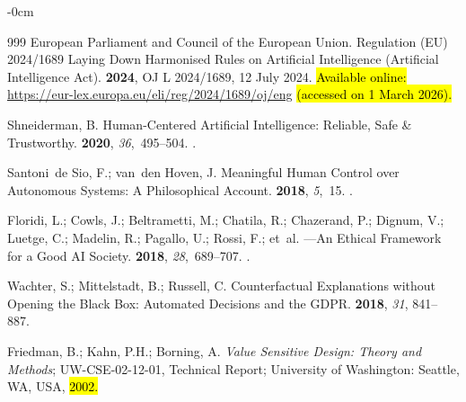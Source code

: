 \documentclass[mca,article,accept,pdftex,oneauthor]{Definitions/mdpi}
\begin{document}
\begin{adjustwidth}{-\extralength}{0cm}
\begin{thebibliography}{999}
{European Parliament and Council of the European Union}.
\newblock Regulation (EU) 2024/1689 Laying Down Harmonised Rules on Artificial
  Intelligence ({Artificial Intelligence Act}).
 {\bf 2024}, OJ L 2024/1689, 12 July 2024.
\newblock \hl{Available online:} %
{\url{https://eur-lex.europa.eu/eli/reg/2024/1689/oj/eng}} \hl{(accessed on 1 March 2026).} %

Shneiderman, B.
\newblock Human-Centered Artificial Intelligence: Reliable, Safe \&
  Trustworthy.
 {\bf
  2020}, {\em 36},~495--504.
.

Santoni~de Sio, F.; van~den Hoven, J.
\newblock Meaningful Human Control over Autonomous Systems: A Philosophical
  Account.
 {\bf 2018}, {\em 5},~15.
.

Floridi, L.; Cowls, J.; Beltrametti, M.; Chatila, R.; Chazerand, P.; Dignum,
  V.; Luetge, C.; Madelin, R.; Pagallo, U.; Rossi, F.;  et~al.
---An Ethical Framework for a Good {AI} Society.
 {\bf 2018}, {\em 28},~689--707.
.

Wachter, S.; Mittelstadt, B.; Russell, C.
\newblock Counterfactual Explanations without Opening the Black Box: Automated
  Decisions and the {GDPR}.
 {\bf 2018}, {\em
  31}, 841--887.
\newblock {} %

Friedman, B.; Kahn, P.H.; Borning, A.
\newblock \emph{Value Sensitive Design: Theory and Methods};
\newblock UW-CSE-02-12-01, Technical Report; University of Washington: Seattle, WA, USA, \hl{2002.} %


\end{thebibliography}
\end{adjustwidth}
\end{document}
